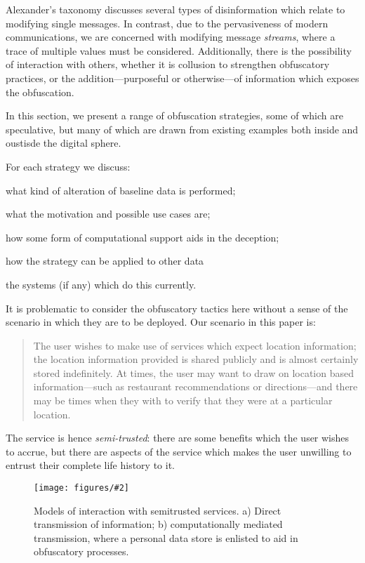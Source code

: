 \documentclass{IOS-Book-Article}     %
\newcommand{\fig}[3][0.9]{
\begin{figure}[tp]
\begin{center}
\texttt{[image: figures/\#2]}
\caption{#3}
\label{fig:#2}
\end{center}
\end{figure}
}
\begin{document}
Alexander's taxonomy \cite{alexander2010Disinformation} discusses several types
of disinformation which relate to modifying single messages. In contrast, due to
the pervasiveness of modern communications, we are concerned with modifying
message \emph{streams}, where a trace of multiple values must be considered.
Additionally, there is the possibility of interaction with others, whether it is
collusion to strengthen obfuscatory practices, or the addition---purposeful or
otherwise---of information which exposes the obfuscation.

In this section, we present a range of obfuscation strategies, some of which are
speculative, but many of which are drawn from existing examples both inside and
oustisde the digital sphere.

For each strategy we discuss: \begin{inparaenum}
\item what kind of alteration of baseline data is performed;
\item what the motivation and possible use cases are;
\item how some form of computational support aids in the deception;
\item how the strategy can be applied to other data
\item the systems (if any) which do this currently.
\end{inparaenum}


It is problematic to consider the obfuscatory tactics here without a sense of
the scenario in which they are to be deployed. Our scenario in this paper is:
\begin{quote}
The user wishes to make use of services which expect location information; 
the location information provided is shared publicly and is almost
certainly stored indefinitely. At times, the user may want to draw on location
based information---such as restaurant recommendations or directions---and there
may be times when they with to verify that they were at a particular location.
\end{quote}
The service is hence \emph{semi-trusted}: there are some benefits which the user
wishes to accrue, but there are aspects of the service which makes the user
unwilling to entrust their complete life history to it.

\fig{Mediation}{Models of interaction with semitrusted services. a) Direct
transmission of information; b) computationally mediated transmission, where a
personal data store is enlisted to aid in obfuscatory processes.}
\end{document}
